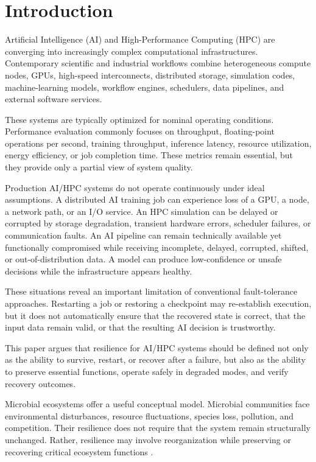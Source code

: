 \documentclass[conference]{IEEEtran}
\begin{document}
\section{Introduction}

Artificial Intelligence (AI) and High-Performance Computing (HPC) are converging into increasingly complex computational infrastructures. Contemporary scientific and industrial workflows combine heterogeneous compute nodes, GPUs, high-speed interconnects, distributed storage, simulation codes, machine-learning models, workflow engines, schedulers, data pipelines, and external software services.

These systems are typically optimized for nominal operating conditions. Performance evaluation commonly focuses on throughput, floating-point operations per second, training throughput, inference latency, resource utilization, energy efficiency, or job completion time. These metrics remain essential, but they provide only a partial view of system quality.

Production AI/HPC systems do not operate continuously under ideal assumptions. A distributed AI training job can experience loss of a GPU, a node, a network path, or an I/O service. An HPC simulation can be delayed or corrupted by storage degradation, transient hardware errors, scheduler failures, or communication faults. An AI pipeline can remain technically available yet functionally compromised while receiving incomplete, delayed, corrupted, shifted, or out-of-distribution data. A model can produce low-confidence or unsafe decisions while the infrastructure appears healthy.

These situations reveal an important limitation of conventional fault-tolerance approaches. Restarting a job or restoring a checkpoint may re-establish execution, but it does not automatically ensure that the recovered state is correct, that the input data remain valid, or that the resulting AI decision is trustworthy.

This paper argues that resilience for AI/HPC systems should be defined not only as the ability to survive, restart, or recover after a failure, but also as the ability to preserve essential functions, operate safely in degraded modes, and verify recovery outcomes.

Microbial ecosystems offer a useful conceptual model. Microbial communities face environmental disturbances, resource fluctuations, species loss, pollution, and competition. Their resilience does not require that the system remain structurally unchanged. Rather, resilience may involve reorganization while preserving or recovering critical ecosystem functions \cite{allison2008,shade2012,philippot2021}.
\end{document}
